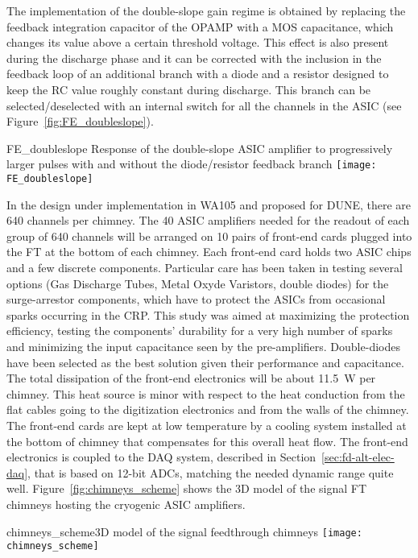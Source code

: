 The implementation of the double-slope gain regime is obtained by
replacing the feedback integration capacitor of the OPAMP with a MOS
capacitance, which changes its value above a certain threshold
voltage. This effect is also present during the discharge phase and it
can be corrected with the inclusion in the feedback loop of an
additional branch with a diode and a resistor designed to keep the RC
value roughly constant during discharge. This branch can be
selected/deselected with an internal switch for all the channels in
the ASIC (see Figure~\ref{fig:FE_doubleslope}).
\begin{cdrfigure}{FE_doubleslope}
{Response of the double-slope ASIC amplifier to progressively larger 
pulses with and without the diode/resistor feedback branch}
\texttt{[image: FE\_doubleslope]}
\end{cdrfigure}

In the design under implementation in WA105 and proposed for DUNE,
there are 640 channels per chimney. The 40 ASIC amplifiers needed for
the readout of each group of 640 channels will be arranged on 10 pairs
of front-end cards plugged into the FT at the bottom of each chimney.
Each front-end card holds two ASIC chips and a few discrete
components. Particular care has been taken in testing several options
(Gas Discharge Tubes, Metal Oxyde Varistors, double diodes) for the
surge-arrestor components, which have to protect the ASICs from
occasional sparks occurring in the CRP.  This study was aimed at
maximizing the protection efficiency, testing the components'
durability for a very high number of sparks and minimizing the input
capacitance seen by the pre-amplifiers. Double-diodes have been
selected as the best solution given their performance and
capacitance. The total dissipation of the front-end electronics will
be about 11.5~W per chimney. This heat source is minor with respect
to the heat conduction from the flat cables going to the digitization
electronics and from the walls of the chimney. The front-end cards are
kept at low temperature by a cooling system installed at the bottom of
chimney 
that compensates for this overall heat flow. The front-end
electronics is coupled to the DAQ system, described in Section~\ref{sec:fd-alt-elec-daq},
that is based on 12-bit ADCs, matching the needed dynamic
range quite well. Figure~\ref{fig:chimneys_scheme} shows the 3D model of the
signal FT chimneys hosting the cryogenic ASIC amplifiers.
\begin{cdrfigure}
{chimneys_scheme}{3D model of the signal feedthrough chimneys}
\texttt{[image: chimneys\_scheme]}
\end{cdrfigure}

